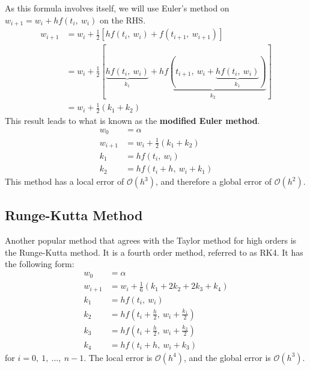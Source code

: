 \documentclass{article}
\begin{document}
As this formula involves itself, we will use Euler's method on
\(w_{i + 1} = w_i + h f\left( t_i,\: w_i \right)\) on the RHS\@.
\begin{align*}
    w_{i + 1} & = w_i + \frac{1}{2} \left[ h f\left( t_i,\: w_i \right) + f\left( t_{i + 1},\: w_{i + 1} \right) \right]                                                                                     \\
              & = w_i + \frac{1}{2} \left[ \underbrace{h f\left( t_i,\: w_i \right)}_{k_1} + \underbrace{h f\left( t_{i + 1},\: w_i + \underbrace{h f\left( t_i,\: w_i \right)}_{k_1} \right)}_{k_2} \right] \\
              & = w_i + \frac{1}{2} \left( k_1 + k_2 \right)
\end{align*}
This result leads to what is known as the \textbf{modified Euler method}.
\begin{align*}
    w_0       & = \alpha                                     \\
    w_{i + 1} & = w_i + \frac{1}{2} \left( k_1 + k_2 \right) \\
    k_1       & = h f\left( t_i,\: w_i \right)               \\
    k_2       & = h f\left( t_i + h,\: w_i + k_1 \right)
\end{align*}
This method has a local error of \(\mathcal{O}\left( h^3 \right)\), and therefore a global error of \(\mathcal{O}\left( h^2 \right)\).
\subsection{Runge-Kutta Method}
Another popular method that agrees with the Taylor method for high orders is the Runge-Kutta method.
It is a fourth order method, referred to as RK4. It has the following form:
\begin{align*}
    w_0       & = \alpha                                                     \\
    w_{i + 1} & = w_i + \frac{1}{6} \left( k_1 + 2 k_2 + 2 k_3 + k_4 \right) \\
    k_1       & = h f\left( t_i,\: w_i \right)                               \\
    k_2       & = h f\left( t_i + \frac{h}{2},\: w_i + \frac{k_1}{2} \right) \\
    k_3       & = h f\left( t_i + \frac{h}{2},\: w_i + \frac{k_2}{2} \right) \\
    k_4       & = h f\left( t_i + h,\: w_i + k_3 \right)
\end{align*}
for \(i = 0,\: 1,\: \ldots,\: n - 1\). The local error is \(\mathcal{O}\left( h^4 \right)\), and the global error is \(\mathcal{O}\left( h^3 \right)\).
\end{document}
